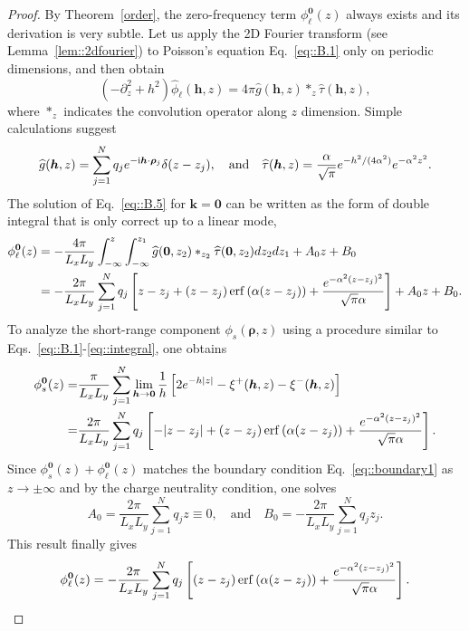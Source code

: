 \begin{proof}
	By Theorem~\ref{order}, the zero-frequency term $\phi^{\bm{0}}_{\ell}(z)$ always exists and its derivation is very subtle. Let us apply the 2D Fourier transform (see Lemma~\ref{lem::2dfourier}) to Poisson's equation Eq.~\eqref{eq::B.1} only on periodic dimensions, and then obtain
	\begin{equation}\label{eq::B.5}
		(-\partial_z^2+h^2)\widehat{\phi}_{\ell}(\bm{h},z)=4\pi\widehat{g}(\bm{h},z)\ast_{z}\widehat{\tau}(\bm{h},z),
	\end{equation}
	where $\ast_z$ indicates the convolution operator along $z$ dimension. Simple calculations suggest
	\begin{equation}
		\widehat{g}(\bm{h},z)=\sum_{j=1}^{N}q_{j} e^{-\mathrm{i} \bm{h}\cdot\bm{\rho}_{j}}\delta(z-z_{j}),\quad\text{and}\quad \widehat{\tau}(\bm{h},z)=\frac{\alpha}{\sqrt{\pi}} e^{-h^2/(4\alpha^2)}e^{-\alpha^2z^2}.
	\end{equation}
	The solution of Eq.~\eqref{eq::B.5} for $\bm{k}=\bm{0}$ can be written as the form of double integral that is only correct up to a linear mode,
	\begin{equation}\begin{split}
			\phi_{\ell}^{\bm{0}}(z)&=-\frac{4\pi}{L_xL_y}\int_{-\infty}^{z}\int_{-\infty}^{z_1}\widehat{g}(\bm{0},z_2)\ast_{z_2}\widehat{\tau}(\bm{0},z_2)dz_2dz_1+A_0z+B_0\\
			&=-\frac{2\pi}{L_xL_y}\sum_{j=1}^{N}q_{j}\left[z-z_{j}+(z-z_{j})\operatorname{erf}\left(\alpha(z-z_{j})\right)+\frac{e^{-\alpha^2(z-z_{j})^2}}{\sqrt{\pi}\alpha}\right]+A_0z+B_0.
		\end{split}
	\end{equation}
	To analyze the short-range component $\phi_{s}(\bm{\rho},z)$ using a procedure similar to Eqs.~\eqref{eq::B.1}-\eqref{eq::integral}, one obtains
	\begin{equation}\begin{split}
			\phi_{s}^{\bm{0}}(z) =& \frac{\pi}{L_x L_y} \sum_{j=1}^{N} \lim_{\bm{h}\rightarrow\bm{0}} \frac{1}{h} \left[2e^{-h|z|}-\xi^{+}(\bm{h},z) - \xi^{-}(\bm{h},z)\right]\\
			=& \frac{2\pi}{L_xL_y}\sum_{j=1}^{N}q_{j}\left[-|z-z_{j}|+(z-z_{j})\operatorname{erf}\left(\alpha(z-z_{j})\right)+\frac{e^{-\alpha^2(z-z_{j})^2}}{\sqrt{\pi}\alpha}\right].
		\end{split}
	\end{equation}
	Since $\phi_{s}^{\bm{0}}(z)+\phi_{\ell}^{\bm{0}}(z)$ matches the boundary condition Eq.~\eqref{eq::boundary1} as $z\rightarrow \pm\infty$ and by the charge neutrality condition, one solves 
	\begin{equation}
		A_0 = \frac{2\pi}{L_xL_y}\sum_{j=1}^{N}q_{j}z \equiv 0,\quad \text{and}\quad B_0=-\frac{2\pi}{L_xL_y}\sum_{j=1}^{N}q_{j}z_{j}.
	\end{equation}
	This result finally gives 
	\begin{equation}
		\phi_{\ell}^{\bm{0}}(z)=-\frac{2\pi}{L_xL_y}\sum_{j=1}^{N}q_{j}\left[(z-z_{j})\operatorname{erf}\left(\alpha(z-z_{j})\right)+\frac{e^{-\alpha^2(z-z_{j})^2}}{\sqrt{\pi}\alpha}\right].
	\end{equation}
\end{proof}

